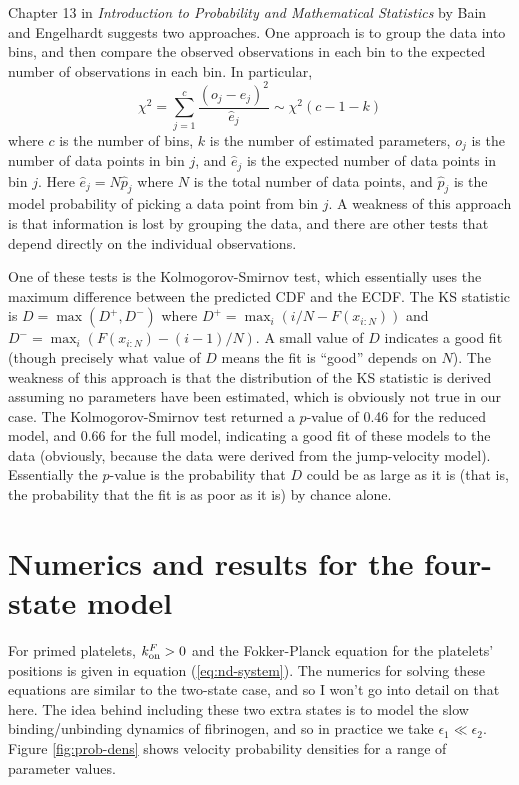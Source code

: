 \documentclass{article}
\newcommand{\tn}{\textnormal}
\begin{document}
Chapter 13 in \textit{Introduction to Probability and Mathematical
  Statistics} by Bain and Engelhardt suggests two approaches. One
approach is to group the data into bins, and then compare the observed
observations in each bin to the expected number of observations in
each bin. In particular,
\begin{equation}
  \label{eq:chi2}
  \chi^2 = \sum_{j=1}^c \frac{(o_j - \hat{e}_j)^2}{\hat{e}_j} \sim
  \chi^2(c - 1 - k)
\end{equation}
where $c$ is the number of bins, $k$ is the number of estimated
parameters, $o_j$ is the number of data points in bin $j$, and
$\hat{e}_j$ is the expected number of data points in bin $j$. Here
$\hat{e}_j = N \hat{p}_j$ where $N$ is the total number of data
points, and $\hat{p}_j$ is the model probability of picking a data
point from bin $j$. A weakness of this approach is that information is
lost by grouping the data, and there are other tests that depend
directly on the individual observations.

One of these tests is the Kolmogorov-Smirnov test, which essentially
uses the maximum difference between the predicted CDF and the
ECDF. The KS statistic is $D = \max(D^+, D^-)$ where
$D^+ = \max_i(i/N - F(x_{i:N}))$ and
$D^- = \max_i(F(x_{i:N}) - (i - 1)/N)$. A small value of $D$ indicates
a good fit (though precisely what value of $D$ means the fit is
``good'' depends on $N$). The weakness of this approach is that the
distribution of the KS statistic is derived assuming no parameters
have been estimated, which is obviously not true in our case. The
Kolmogorov-Smirnov test returned a $p$-value of 0.46 for the reduced
model, and 0.66 for the full model, indicating a good fit of these
models to the data (obviously, because the data were derived from the
jump-velocity model). Essentially the $p$-value is the probability
that $D$ could be as large as it is (that is, the probability that the
fit is as poor as it is) by chance alone.

\section{Numerics and results for the four-state model}
\label{sec:numer-results-prim}

For primed platelets, $k_\tn{on}^F > 0$ and the Fokker-Planck equation
for the platelets' positions is given in equation
(\ref{eq:nd-system}). The numerics for solving these equations are
similar to the two-state case, and so I won't go into detail on that
here. The idea behind including these two extra states is to model the
slow binding/unbinding dynamics of fibrinogen, and so in practice we
take $\epsilon_1 \ll \epsilon_2$. Figure \ref{fig:prob-dens} shows
velocity probability densities for a range of parameter values.
\end{document}
